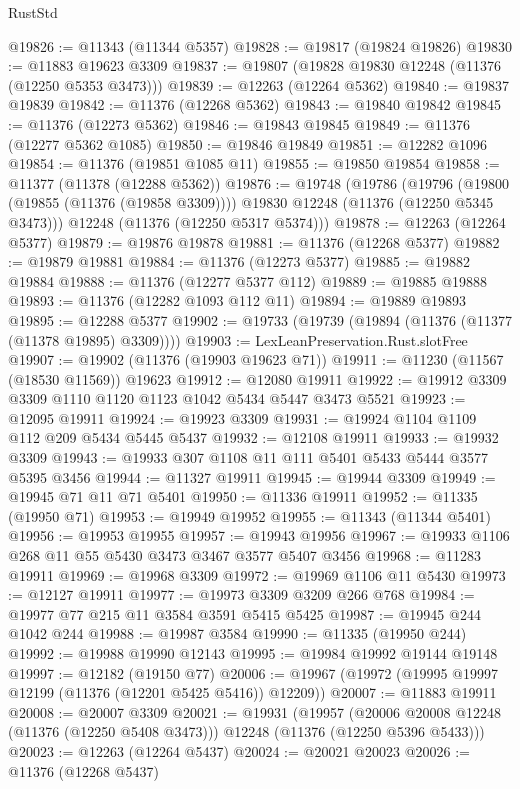 \begin{lexlean}{RustStd}
\begin{coremodule}
{\begin{coremodule}
{{{{{{{{{{{{{{{{{{{{{{{{{{{{{{{{{{{{{{{{{{{{{{{{{{{{{{{{{{{{{{{{{{{{{{{{{{{{{{{{{{{{{@19826 := @11343 (@11344 @5357)
@19828 := @19817 (@19824 @19826)
@19830 := @11883 @19623 @3309
@19837 := @19807 (@19828 @19830 @12248 (@11376 (@12250 @5353 @3473)))
@19839 := @12263 (@12264 @5362)
@19840 := @19837 @19839
@19842 := @11376 (@12268 @5362)
@19843 := @19840 @19842
@19845 := @11376 (@12273 @5362)
@19846 := @19843 @19845
@19849 := @11376 (@12277 @5362 @1085)
@19850 := @19846 @19849
@19851 := @12282 @1096
@19854 := @11376 (@19851 @1085 @11)
@19855 := @19850 @19854
@19858 := @11377 (@11378 (@12288 @5362))
@19876 := @19748
    (@19786
      (@19796 (@19800 (@19855 (@11376 (@19858 @3309)))) @19830 @12248 (@11376 (@12250 @5345 @3473)))
      @12248
      (@11376 (@12250 @5317 @5374)))
@19878 := @12263 (@12264 @5377)
@19879 := @19876 @19878
@19881 := @11376 (@12268 @5377)
@19882 := @19879 @19881
@19884 := @11376 (@12273 @5377)
@19885 := @19882 @19884
@19888 := @11376 (@12277 @5377 @112)
@19889 := @19885 @19888
@19893 := @11376 (@12282 @1093 @112 @11)
@19894 := @19889 @19893
@19895 := @12288 @5377
@19902 := @19733 (@19739 (@19894 (@11376 (@11377 (@11378 @19895) @3309))))
@19903 := LexLeanPreservation.Rust.slotFree
@19907 := @19902 (@11376 (@19903 @19623 @71))
@19911 := @11230 (@11567 (@18530 @11569)) @19623
@19912 := @12080 @19911
@19922 := @19912 @3309 @3309 @1110 @1120 @1123 @1042 @5434 @5447 @3473 @5521
@19923 := @12095 @19911
@19924 := @19923 @3309
@19931 := @19924 @1104 @1109 @112 @209 @5434 @5445 @5437
@19932 := @12108 @19911
@19933 := @19932 @3309
@19943 := @19933 @307 @1108 @11 @111 @5401 @5433 @5444 @3577 @5395 @3456
@19944 := @11327 @19911
@19945 := @19944 @3309
@19949 := @19945 @71 @11 @71 @5401
@19950 := @11336 @19911
@19952 := @11335 (@19950 @71)
@19953 := @19949 @19952
@19955 := @11343 (@11344 @5401)
@19956 := @19953 @19955
@19957 := @19943 @19956
@19967 := @19933 @1106 @268 @11 @55 @5430 @3473 @3467 @3577 @5407 @3456
@19968 := @11283 @19911
@19969 := @19968 @3309
@19972 := @19969 @1106 @11 @5430
@19973 := @12127 @19911
@19977 := @19973 @3309 @3209 @266 @768
@19984 := @19977 @77 @215 @11 @3584 @3591 @5415 @5425
@19987 := @19945 @244 @1042 @244
@19988 := @19987 @3584
@19990 := @11335 (@19950 @244)
@19992 := @19988 @19990 @12143
@19995 := @19984 @19992 @19144 @19148
@19997 := @12182 (@19150 @77)
@20006 := @19967 (@19972 (@19995 @19997 @12199 (@11376 (@12201 @5425 @5416)) @12209))
@20007 := @11883 @19911
@20008 := @20007 @3309
@20021 := @19931
    (@19957
      (@20006 @20008 @12248 (@11376 (@12250 @5408 @3473)))
      @12248
      (@11376 (@12250 @5396 @5433)))
@20023 := @12263 (@12264 @5437)
@20024 := @20021 @20023
@20026 := @11376 (@12268 @5437)
}}}}}}}}}}}}}}}}}}}}}}}}}}}}}}}}}}}}}}}}}}}}}}}}}}}}}}}}}}}}}}}}}}}}}}}}}}}}}}}}}}}}}
\end{coremodule}}
\end{coremodule}
\end{lexlean}
